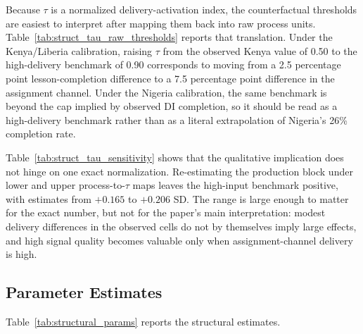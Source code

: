 \documentclass[11pt]{article}
\begin{document}


Because $\tau$ is a normalized delivery-activation index, the counterfactual thresholds are easiest to interpret after mapping them back into raw process units. Table~\ref{tab:struct_tau_raw_thresholds} reports that translation. Under the Kenya/Liberia calibration, raising $\tau$ from the observed Kenya value of 0.50 to the high-delivery benchmark of 0.90 corresponds to moving from a 2.5 percentage point lesson-completion difference to a 7.5 percentage point difference in the assignment channel. Under the Nigeria calibration, the same benchmark is beyond the cap implied by observed DI completion, so it should be read as a high-delivery benchmark rather than as a literal extrapolation of Nigeria's 26\% completion rate.



Table~\ref{tab:struct_tau_sensitivity} shows that the qualitative implication does not hinge on one exact normalization. Re-estimating the production block under lower and upper process-to-$\tau$ maps leaves the high-input benchmark positive, with estimates from $+0.165$ to $+0.206$ SD. The range is large enough to matter for the exact number, but not for the paper's main interpretation: modest delivery differences in the observed cells do not by themselves imply large effects, and high signal quality becomes valuable only when assignment-channel delivery is high.



\subsection{Parameter Estimates}
\label{subsec:struct_estimates}

Table~\ref{tab:structural_params} reports the structural estimates.


\end{document}
